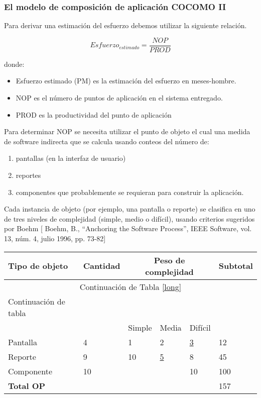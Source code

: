 \subsubsection{El modelo de composición de aplicación COCOMO II }
Para derivar una estimación del esfuerzo debemos utilizar la siguiente relación.

\[ Esfuerzo_{estimado} = \frac{NOP}{PROD}\]

donde:
\begin{itemize}
	\item Esfuerzo estimado (PM) es la estimación del esfuerzo en meses-hombre. 
	\item NOP es el número de puntos de aplicación en el sistema entregado. 
	\item PROD es la productividad del punto de aplicación	
\end{itemize}


Para determinar NOP se necesita utilizar el punto de objeto el cual una medida de software indirecta que se calcula usando conteos del número de:
\begin{enumerate}
	\item pantallas (en la interfaz de usuario)
	\item reportes 
	\item componentes que probablemente se requieran para construir la aplicación.
\end{enumerate}

Cada instancia de objeto (por ejemplo, una pantalla o reporte) se clasifica en uno de tres niveles de complejidad (simple, medio o difícil), usando criterios sugeridos por Boehm [ Boehm, B., “Anchoring the Software Process”, IEEE Software, vol. 13, núm. 4, julio 1996, pp. 73-82]



\begin{longtable}{  l | l | l | l | l | l  }	
	
	\hline
	
	\textbf{Tipo de objeto } & \textbf{Cantidad } & \multicolumn{3}{|c|}{\textbf{Peso de complejidad}} & \textbf{Subtotal }  \\
	
	\endfirsthead
	
	\multicolumn{6}{c}{Continuación de Tabla \ref{long}}\\
	\hline
	Continuación de tabla\\
	\hline
	\endhead
	
	\hline
	\endfoot
	
	& & Simple & Media & Difícil &  \\
	\hline
	\hline
	Pantalla & 4 & 1 & 2 & \underline{3} & 12 \\
	Reporte & 9 & 10 & \underline{5} & 8 & 45 \\
	Componente & 10 &  &  & 10 & 100 \\
	\hline
	\multicolumn{5}{l|}{\textbf{Total OP}}&  157 \\	
\end{longtable}

